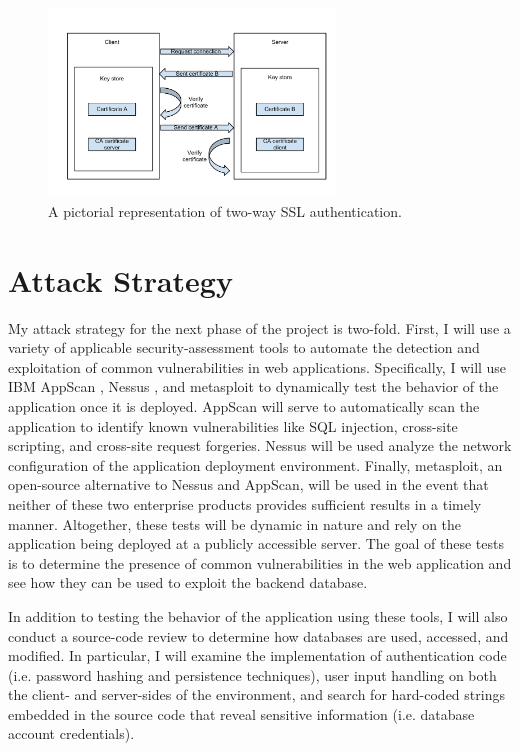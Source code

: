 \documentclass{sig-alternate}
\begin{document}
\begin{figure}[ht!]
\begin{center}
\includegraphics[width=3in]{images/two_way_ssl.pdf}
\caption{A pictorial representation of two-way SSL authentication.}
\label{fig:ssl}
\end{center}
\end{figure}

\section{Attack Strategy}
\label{sec:attack}

My attack strategy for the next phase of the project is two-fold. First, I will use a variety of applicable security-assessment 
tools to automate the detection and exploitation of common vulnerabilities in web applications. 
Specifically, I will use IBM AppScan \cite{_ibm_appscan}, Nessus \cite{_nessus}, and metasploit \cite{_penetration_metasploit} to dynamically test the behavior
of the application once it is deployed. AppScan will serve to automatically scan the application to identify
known vulnerabilities like SQL injection, cross-site scripting, and cross-site request forgeries. Nessus will be used
analyze the network configuration of the application deployment environment. Finally, metasploit, an open-source
alternative to Nessus and AppScan, will be used in the event that neither of these two enterprise products provides
sufficient results in a timely manner. Altogether, these tests will be dynamic in nature and rely on the 
application being deployed at a publicly
accessible server. The goal of these tests is to determine the presence of common vulnerabilities in the web application
and see how they can be used to exploit the backend database. 

In addition to testing the behavior of the application using these tools, I will also conduct a source-code review 
to determine how databases are used, accessed, and modified. In particular, I will examine the implementation of 
authentication code (i.e. password hashing and persistence techniques), user input handling on 
both the client- and server-sides of the environment, and search for hard-coded strings embedded in 
the source code that reveal sensitive information (i.e. database account credentials).
\end{document}
